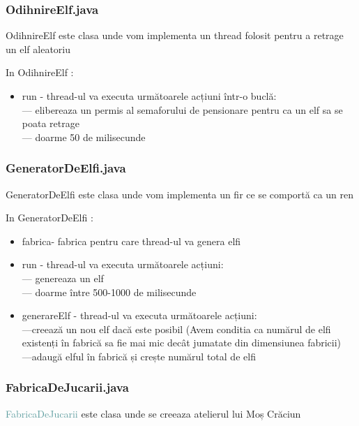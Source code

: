 \documentclass{article}
\begin{document}
\subsubsection{\textcolor{Periwinkle}{OdihnireElf.java}}
\textcolor{YellowOrange}{OdihnireElf} este clasa unde vom implementa un thread folosit pentru a retrage un elf aleatoriu

In OdihnireElf :
\begin{itemize}
\item \textcolor{Dandelion}{run} - thread-ul  va executa următoarele acțiuni într-o buclă:\\
--- elibereaza un permis al semaforului de pensionare pentru ca un elf sa se poata retrage\\
--- doarme 50 de milisecunde

\end{itemize}

\subsubsection{\textcolor{Periwinkle}{GeneratorDeElfi.java}}
\textcolor{YellowOrange}{GeneratorDeElfi} este clasa unde vom implementa un fir ce se comportă ca un ren

In GeneratorDeElfi :
\begin{itemize}
\item  \textcolor{Dandelion}{fabrica}- fabrica pentru care thread-ul va genera elfi
\item \textcolor{Dandelion}{run} - thread-ul va executa următoarele acțiuni:\\
--- genereaza un elf \\
--- doarme între 500-1000 de milisecunde
\item \textcolor{Dandelion}{generareElf} - thread-ul va executa următoarele acțiuni:\\
---creează un nou elf dacă este posibil (Avem conditia ca numărul de elfi existenți în fabrică sa fie mai mic decât jumatate din dimensiunea fabricii)\\
---adaugă elful în fabrică și crește numărul total de elfi

\end{itemize}


\subsubsection{\textcolor{Periwinkle}{FabricaDeJucarii.java}}
\textcolor{CadetBlue}{FabricaDeJucarii} este clasa unde se creeaza atelierul lui Moș Crăciun
\end{document}
